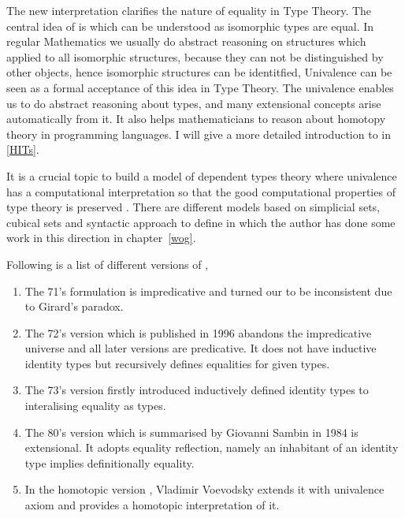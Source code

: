 The new interpretation clarifies the nature of equality in Type Theory.
The central idea of \hott is  which can be understood as isomorphic types are equal.
In regular Mathematics we usually do abstract reasoning on structures which applied to all isomorphic structures, because they can not be distinguished by other objects, hence isomorphic structures can be identitfied, Univalence can be seen as a formal acceptance of this idea in Type Theory. 
The univalence enables us to do abstract reasoning about types, and many extensional concepts arise automatically from it. It also helps mathematicians to reason about homotopy theory in programming languages. 
I will give a more detailed introduction to \hott in \autoref{HITs}.

It is a crucial topic to build a model of dependent types theory where univalence has a computational interpretation so that the good computational properties of type theory is preserved \cite{bezem2013model}. There are different models based on simplicial sets, cubical sets and syntactic approach to define \wog in \itt which the author has done some work in this direction in chapter~\ref{wog}.

Following is a list of different versions of \mltt,

\begin{enumerate}

\item The 71's formulation \cite{per:71} is impredicative and turned our to be inconsistent due to Girard's paradox.

\item The 72's version which is published in 1996 \cite{Martin-Lof-1972} abandons the impredicative universe and all later versions are predicative. It does not have inductive identity types but recursively defines equalities for given types.

\item The 73's version \cite{Martin-Lof-1973} firstly introduced inductively defined identity types to interalising equality as types. 

\item The 80's version which is summarised by Giovanni Sambin in 1984 \cite{martin1984intuitionistic} is extensional. It adopts equality reflection, namely an inhabitant of an identity type implies definitionally equality.

\item In the homotopic version \cite{hott}, Vladimir Voevodsky extends it with univalence axiom and provides a homotopic interpretation of it.

\end{enumerate}



